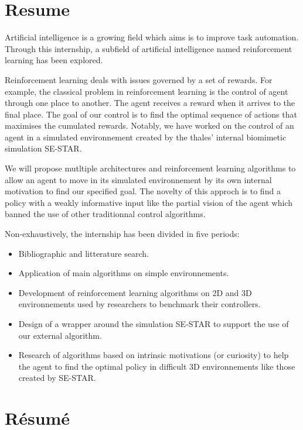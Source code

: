 \section*{Resume}
\bigskip

Artificial intelligence is a growing field which aims is to improve task automation. Through this internship, a subfield of artificial intelligence named reinforcement learning has been explored.

Reinforcement learning deals with issues governed by a set of rewards. For example, the classical problem in reinforcement learning is the control of agent through one place to another. The agent receives a reward when it arrives to the final place.  The goal of our control is to find the optimal sequence of actions that maximises the cumulated rewards. Notably, we have worked on the control of an agent in a simulated environnement created by the thales' internal biomimetic simulation SE-STAR.


We will propose mutltiple architectures and reinforcement learning algorithms to allow an agent to move in its simulated environnement by its own internal motivation to find our specified goal. The novelty of this approch is to find a policy with a weakly informative input like the partial vision of the agent which banned the use of other traditionnal control algorithms. 

Non-exhaustively, the internship has been divided in five periods:

\begin{itemize}
    \item Bibliographic and litterature search.
    \item Application of main algorithms on simple environnements.
    \item Development of reinforcement learning algorithms on 2D and 3D environnements used by researchers to benchmark their controllers. 
    \item Design of a wrapper around the simulation SE-STAR to support the use of our external algorithm.
    \item Research of algorithms based on intrinsic motivations (or curiosity) to help the agent to find the optimal policy in difficult 3D environnements like those created by SE-STAR. 
\end{itemize} 

\newpage


\section*{Résumé}
\bigskip

